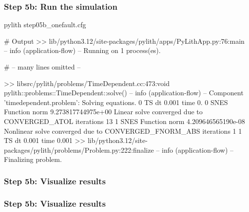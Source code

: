 \documentclass[aspectratio=169]{beamer}
\begin{document}
\begin{frame}[fragile]
  \frametitle{Step 5b: Run the simulation}
  \summary{}

\begin{pyrejournal}
pylith step05b_onefault.cfg

# Output
 >> lib/python3.12/site-packages/pylith/apps/PyLithApp.py:76:main
 -- info (application-flow)
 -- Running on 1 process(es).

# -- many lines omitted --

 >> libsrc/pylith/problems/TimeDependent.cc:473:void pylith::problems::TimeDependent::solve()
 -- info (application-flow)
 -- Component 'timedependent.problem': Solving equations.
0 TS dt 0.001 time 0.
    0 SNES Function norm 9.273817744975e+00
      Linear solve converged due to CONVERGED_ATOL iterations 13
    1 SNES Function norm 4.209646565190e-08
    Nonlinear solve converged due to CONVERGED_FNORM_ABS iterations 1
1 TS dt 0.001 time 0.001
 >> lib/python3.12/site-packages/pylith/problems/Problem.py:222:finalize
 -- info (application-flow)
 -- Finalizing problem.
\end{pyrejournal}
  
\end{frame}


\begin{frame}
  \frametitle{Step 5b: Visualize results}

    
\end{frame}


\begin{frame}
  \frametitle{Step 5b: Visualize results}

    
\end{frame}
\end{document}
